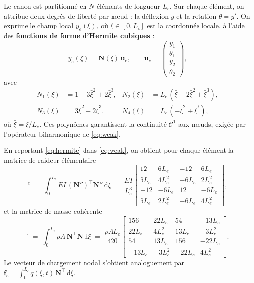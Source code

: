 \documentclass[12pt,a4paper]{article}
\begin{document}
	Le canon est partitionné en $N$ éléments de longueur $L_e$. Sur chaque élément, on attribue deux degrés de liberté par n\oe ud : la déflexion $y$ et la rotation $\theta = y'$. On exprime le champ local $y_e(\xi)$, où $\xi \in [0,L_e]$ est la coordonnée locale, à l'aide des \textbf{fonctions de forme d'Hermite cubiques} :
	\begin{equation}
		\label{eq:hermite}
		y_e(\xi) = \mathbf{N}(\xi)\, \mathbf{u}_e, \qquad \mathbf{u}_e = \begin{pmatrix} y_1 \\ \theta_1 \\ y_2 \\ \theta_2 \end{pmatrix},
	\end{equation}
	avec
	\begin{align*}
		N_1(\xi) &= 1 - 3\bar\xi^2 + 2\bar\xi^3, & N_2(\xi) &= L_e\,(\bar\xi - 2\bar\xi^2 + \bar\xi^3), \\
		N_3(\xi) &= 3\bar\xi^2 - 2\bar\xi^3, & N_4(\xi) &= L_e\,(-\bar\xi^2 + \bar\xi^3),
	\end{align*}
	où $\bar\xi = \xi/L_e$. Ces polynômes garantissent la continuité $\mathcal{C}^1$ aux n\oe uds, exigée par l'opérateur biharmonique de \eqref{eq:weak}.

	En reportant \eqref{eq:hermite} dans \eqref{eq:weak}, on obtient pour chaque élément la matrice de raideur élémentaire
	\begin{equation}
		[K]^e \;=\; \int_0^{L_e} EI\, (\mathbf{N}'')^{\!\top} \mathbf{N}'' \,\mathrm{d}\xi
		\;=\; \frac{EI}{L_e^3}
		\begin{bmatrix}
			12     & 6L_e   & -12    & 6L_e   \\
			6L_e   & 4L_e^2 & -6L_e  & 2L_e^2 \\
			-12    & -6L_e  & 12     & -6L_e  \\
			6L_e   & 2L_e^2 & -6L_e  & 4L_e^2
		\end{bmatrix},
	\end{equation}
	et la matrice de masse cohérente
	\begin{equation}
		[M]^e \;=\; \int_0^{L_e} \rho A\, \mathbf{N}^{\!\top} \mathbf{N} \,\mathrm{d}\xi
		\;=\; \frac{\rho A L_e}{420}
		\begin{bmatrix}
			156    & 22L_e  & 54     & -13L_e \\
			22L_e  & 4L_e^2 & 13L_e  & -3L_e^2 \\
			54     & 13L_e  & 156    & -22L_e \\
			-13L_e & -3L_e^2 & -22L_e & 4L_e^2
		\end{bmatrix}.
	\end{equation}
	Le vecteur de chargement nodal s'obtient analogue\-ment par $\mathbf{f}_e = \int_0^{L_e} q(\xi,t)\, \mathbf{N}^{\!\top}\,\mathrm{d}\xi$.
\end{document}
